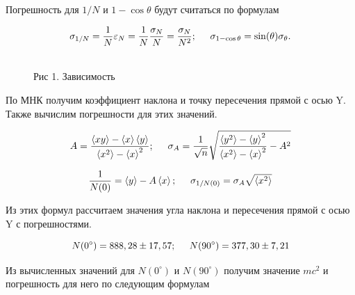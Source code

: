 \documentclass[12pt]{article}
\begin{document}
    Погрешность для $1/N$ и $1 - \cos\theta$ будут считаться по формулам

    $$
      \sigma_{1/N} = \frac{1}{N} \varepsilon_N = \frac{1}{N} \frac{\sigma_N}{N}
      = \frac{\sigma_N}{N^2}; \hspace{0.5cm}
      \sigma_{1 - \cos\theta} = \sin(\theta) \sigma_{\theta}.
    $$

    \begin{figure}[h!]
      \\
      Рис 1. Зависимость
      \label{fig:oscillograme}
    \end{figure}

    По МНК получим коэффициент наклона и точку пересечения прямой с осью Y.
    Также вычислим погрешности для этих значений.

    $$
      A = \frac{\left<xy\right> - \left<x\right>\left<y\right>}{\left<x^2\right>
      - \left<x\right>^2}; \hspace{0.5cm} \sigma_A = \frac{1}{\sqrt{n}}
      \sqrt{\frac{\left<y^2\right> - \left<y\right>^2}{\left<x^2\right> -
      \left<x\right>^2} - A^2}
    $$

    $$
      \frac{1}{N(0)} = \left<y\right> - A \left<x\right>; \hspace{0.5cm}
      \sigma_{1/N(0)} = \sigma_A \sqrt{\left<x^2\right>}
    $$

    Из этих формул рассчитаем значения угла наклона и пересечения прямой с осью
    Y с погрешностями.

    $$
      N(0^{\circ}) = 888,28 \pm 17,57; \hspace{0.5cm}
      N(90^{\circ}) = 377,30 \pm 7,21
    $$

    Из вычисленных значений для $N(0^{\circ})$ и $N(90^{\circ})$ получим
    значение $mc^2$ и погрешность для него по следующим формулам
\end{document}
